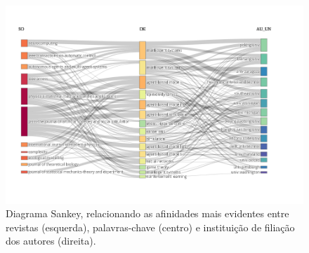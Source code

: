 \begin{figure}
    \centering
    \includegraphics[angle=90,width=1\textwidth,height=0.9\textheight]{experiments/jhcf/PesqBibliogr/SimulacaoMultiagente/WoS-20220203/Descritiva/MASSA2-Three-Fields-Plot-SO:DE:AU_UN.png}
    \caption{Diagrama Sankey, relacionando as afinidades mais evidentes entre revistas (esquerda), palavras-chave (centro) e instituição de filiação dos autores (direita).}
    \label{fig:MASSA2:Sankey:SO:DE:AU_UN}
\end{figure}

